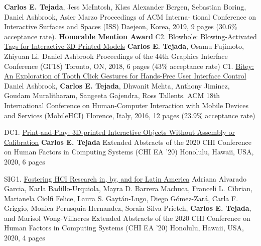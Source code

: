 \begin{cvpublications}
        {\textbf{Carlos E. Tejada}, Jess McIntosh, Klæs Alexander Bergen, Sebastian Boring, Daniel Ashbrook, Asier Marzo}%
        {Proceedings of ACM Interna- tional Conference on Interactive Surfaces and Spaces (ISS)}%
        {Daejeon, Korea, 2019, 9 pages (30.6\% acceptance rate). \bf Honorable Mention Award}
      \cvpublication%
        {C2.}%
        {\href{https://doi.org/10.20380/GI2018.18}{Blowhole: Blowing-Activated Tags for Interactive 3D-Printed Models}}%
        {\textbf{Carlos E. Tejada}, Osamu Fujimoto, Zhiyuan Li. Daniel Ashbrook}%
        {Proceedings of the 44th Graphics Interface Conference (GI’18)}%
        {Toronto, ON, 2018, 6 pages (43\% acceptance rate)}
      \cvpublication%
        {C1.}%
        {\href{https://doi.org/10.1145/2935334.2935389}{Bitey: An Exploration of Tooth Click Gestures for Hands-Free User Interface Control}}%
        {Daniel Ashbrook, \textbf{Carlos E. Tejada}, Dhwanit Mehta, Anthony Jiminez, Goudam Muralitharam, Sangeeta Gajendra, Ross Tallents.}%
        {ACM 18th International Conference on Human-Computer Interaction with Mobile Devices and Services (MobileHCI)}%
        {Florence, Italy, 2016, 12 pages (23.9\% acceptance rate)}
    \end{cvpublications}

    \begin{cvpublications}
      \cvpublication%
        {DC1.}%
        {\href{https://doi.org/10.1145/3334480.3375025}{Print-and-Play: 3D-printed Interactive Objects Without Assembly or Calibration}}%
        {\textbf{Carlos E. Tejada}}%
        {Extended Abstracts of the 2020 CHI Conference on Human Factors in Computing Systems (CHI EA ’20)}%
        {Honolulu, Hawaii, USA, 2020, 6 pages}
    \end{cvpublications}

  \pagebreak
    \begin{cvpublications}
      \cvpublication%
        {SIG1.}%
        {\href{https://doi.org/10.1145/3334480.3381055}{Fostering HCI Research in, by, and for Latin America}}%
        {Adriana Alvarado Garcia, Karla Badillo-Urquiola, Mayra D. Barrera Machuca, Franceli L. Cibrian, Marianela Ciolfi Felice, Laura S. Gaytán-Lugo, Diego Gómez-Zará, Carla F. Griggio, Monica Perusquia-Hernandez, Soraia Silva-Prietch, \textbf{Carlos E. Tejada}, and Marisol Wong-Villacres}%
        {Extended Abstracts of the 2020 CHI Conference on Human Factors in Computing Systems (CHI EA ’20)}%
        {Honolulu, Hawaii, USA, 2020, 4 pages}
    \end{cvpublications}
